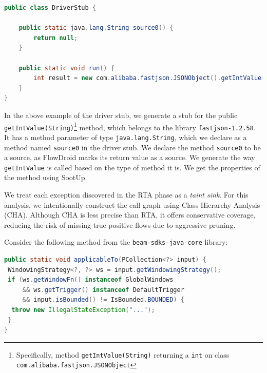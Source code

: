 \begin{lstlisting}[language=Java,breaklines=true,breakatwhitespace=false,basicstyle=\scriptsize\ttfamily]
public class DriverStub {

    public static java.lang.String source0() {
        return null;
    }

    public static void run() {
        int result = new com.alibaba.fastjson.JSONObject().getIntValue(source0());
    }
}
\end{lstlisting}

In the above example of the driver stub, we generate a stub for the public \texttt{getIntValue(String)}\footnote{Specifically, method \texttt{getIntValue(String)} returning a \texttt{int} on class \texttt{com.alibaba.fastjson.JSONObject}} method, which belongs to the library \texttt{fastjson-1.2.58}. It has a method parameter of type \texttt{java.lang.String}, which we declare as a method named \texttt{source0} in the driver stub. We declare the method \texttt{source0} to be a source, as FlowDroid marks its return value as a source. We generate the way \texttt{getIntValue} is called based on the type of method it is. We get the properties of the method using SootUp.

We treat each exception discovered in the RTA phase as a \textit{taint sink}. For this analysis, we intentionally construct the call graph using Class Hierarchy Analysis (CHA). Although CHA is less precise than RTA, it offers conservative coverage, reducing the risk of missing true positive flows due to aggressive pruning.

Consider the following method from the \texttt{beam-sdks-java-core} library:

\begin{lstlisting}[language=Java,breaklines=true,breakatwhitespace=false,basicstyle=\scriptsize\ttfamily]
public static void applicableTo(PCollection<?> input) {
 WindowingStrategy<?, ?> ws = input.getWindowingStrategy();
 if (ws.getWindowFn() instanceof GlobalWindows
     && ws.getTrigger() instanceof DefaultTrigger
     && input.isBounded() != IsBounded.BOUNDED) {
  throw new IllegalStateException("...");
 }
}
\end{lstlisting}

